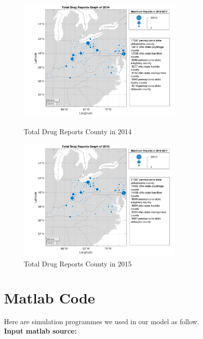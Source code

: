 \documentclass{mcmthesis}
\begin{document}
\begin{appendices}
\begin{figure}[H]
\centering
\begin{minipage}[t]{0.45\textwidth}
\centering
\includegraphics[width=3.2in]{figures/TotalDrugReportsCounty2014.png}
\caption{Total Drug Reports County in 2014}
\label{Total Drug Reports County in 2014}
\end{minipage}
\hfill
\begin{minipage}[t]{0.45\textwidth}
\centering
\includegraphics[width=3.2in]{figures/TotalDrugReportsCounty2015.png}
\caption{Total Drug Reports County in 2015}
\label{Total Drug Reports County in 2015}
\end{minipage}
\end{figure}











\section{Matlab Code}\label{Matlab Code}

Here are simulation programmes we used in our model as follow.\\

\textbf{\textcolor[rgb]{0.98,0.00,0.00}{Input matlab source:}}









\end{appendices}
\end{document}
